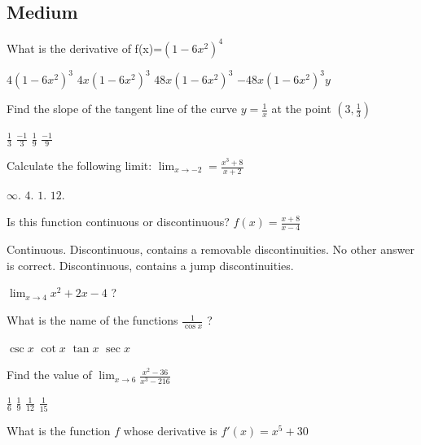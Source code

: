 \documentclass{exam}
\begin{document}
\begin{questions}

\section{Medium}
	\question What is the derivative of f(x)=$(1-6x^2)^4$
	\begin{choices}
		\choice $4(1-6x^2)^3$
		\choice $4x(1-6x^2)^3$
		\choice $48x(1-6x^2)^3$
		\CorrectChoice $-48x(1-6x^2)^3 y$
	\end{choices}

	\question Find the slope of the tangent line of the curve $y = \frac{1}{x}$ at the point $(3,\frac13)$

	\begin{choices}
		\choice $\frac{1}{3}$
		\choice $\frac{-1}{3}$
		\choice $\frac{1}{9}$
		\CorrectChoice $\frac{-1}{9}$
	\end{choices}

	\question Calculate the following limit: $\lim_{x \to -2} = \frac{x^3+8}{x+2}\ $

	\begin{choices}
		\choice $\infty$.
		\choice $4$.
		\choice $1$.
		\CorrectChoice $12$.
	\end{choices}
	\question  Is this function continuous or discontinuous? $f(x) = \frac{x+8}{x-4}$

	\begin{choices}
		\choice  Continuous.
		\choice Discontinuous, contains a removable discontinuities.
		\choice No other answer is correct.
		\CorrectChoice Discontinuous, contains a jump discontinuities.
	\end{choices}

	\question $\displaystyle \lim_{x\to 4}{x^{2} + 2 x - 4}$ ?

	\begin{choices}
		\choice 14
		\choice 16
		\choice 18
		\CorrectChoice 20
	\end{choices}

	\question What is the name of the functions $\frac1{\cos x}$ ?
	\begin{choices}
		\choice $\csc x$
		\choice $\cot x$
		\choice $\tan x$
		\CorrectChoice $\sec x$
	\end{choices}

	\question Find the value of $\displaystyle \lim_{x \to 6} \frac{x^2 -36}{x^3 -216}$

	\begin{choices}
		\choice $\frac{1}{6}$
		\CorrectChoice $\frac{1}{9}$
		\choice $\frac{1}{12}$
		\choice $\frac{1}{15}$
	\end{choices}
	\question What is the function $f$ whose derivative is $f'(x)=x^5 +30$


\end{questions}
\end{document}
